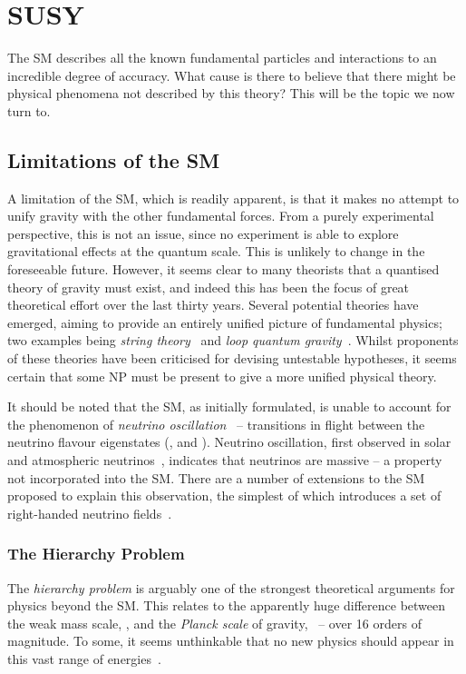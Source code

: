 \chapter{\acl{SUSY}}
\label{sec:susy}
The \ac{SM} describes all the known fundamental particles and interactions to an
incredible degree of accuracy. What cause is there to believe that there might
be physical phenomena not described by this theory? This will be the topic we
now turn to.

\section{Limitations of the \acl{SM}}
\label{sec:susy_limitations_sm}
A limitation of the \ac{SM}, which is readily apparent, is that it makes no
attempt to unify gravity with the other fundamental forces. From a purely
experimental perspective, this is not an issue, since no experiment is able to
explore gravitational effects at the quantum scale. This is unlikely to change
in the foreseeable future. However, it seems clear to many theorists that a
quantised theory of gravity must exist, and indeed this has been the focus of
great theoretical effort over the last thirty years. Several potential theories
have emerged, aiming to provide an entirely unified picture of fundamental
physics; two examples being \emph{string theory}~\cite{string_theory} and
\emph{loop quantum gravity}~\cite{loop_quantum}. Whilst proponents of these
theories have been criticised for devising untestable hypotheses, it seems
certain that some \ac{NP} must be present to give a more unified physical
theory.

It should be noted that the \ac{SM}, as initially formulated, is unable to
account for the phenomenon of \emph{neutrino oscillation}~\cite{pdg} --
transitions in flight between the neutrino flavour eigenstates (\Pnue, \Pnum and
\Pnut). Neutrino oscillation, first observed in solar and atmospheric
neutrinos~\cite{neutrino_osc,neutrino_osc_discovery}, indicates that neutrinos
are massive -- a property not incorporated into the \ac{SM}. There are a number
of extensions to the \ac{SM} proposed to explain this observation, the simplest
of which introduces a set of right-handed neutrino fields~\cite{pdg}.

\subsection{The Hierarchy Problem}
The \emph{hierarchy problem} is arguably one of the strongest theoretical
arguments for physics beyond the \ac{SM}. This relates to the apparently huge
difference between the weak mass scale, \Mweak, and the \emph{Planck scale} of
gravity, \Mplanck\ -- over 16 orders of magnitude. To some, it seems unthinkable
that no new physics should appear in this vast range of
energies~\cite{susy_primer}.


